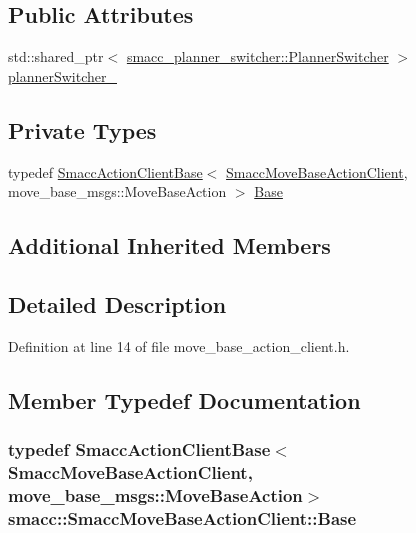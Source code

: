 \subsection*{Public Attributes}
\begin{DoxyCompactItemize}
\item 
std\+::shared\+\_\+ptr$<$ \hyperlink{classsmacc__planner__switcher_1_1PlannerSwitcher}{smacc\+\_\+planner\+\_\+switcher\+::\+Planner\+Switcher} $>$ \hyperlink{classsmacc_1_1SmaccMoveBaseActionClient_ae24164268108abf0b35cf51bfba5ec67}{planner\+Switcher\+\_\+}
\end{DoxyCompactItemize}
\subsection*{Private Types}
\begin{DoxyCompactItemize}
\item 
typedef \hyperlink{classsmacc_1_1SmaccActionClientBase}{Smacc\+Action\+Client\+Base}$<$ \hyperlink{classsmacc_1_1SmaccMoveBaseActionClient}{Smacc\+Move\+Base\+Action\+Client}, move\+\_\+base\+\_\+msgs\+::\+Move\+Base\+Action $>$ \hyperlink{classsmacc_1_1SmaccMoveBaseActionClient_a076cd5f05503e4689c9c34c4a8add1b8}{Base}
\end{DoxyCompactItemize}
\subsection*{Additional Inherited Members}


\subsection{Detailed Description}


Definition at line 14 of file move\+\_\+base\+\_\+action\+\_\+client.\+h.



\subsection{Member Typedef Documentation}
\subsubsection[{\texorpdfstring{Base}{Base}}]{\setlength{\rightskip}{0pt plus 5cm}typedef {\bf Smacc\+Action\+Client\+Base}$<${\bf Smacc\+Move\+Base\+Action\+Client}, move\+\_\+base\+\_\+msgs\+::\+Move\+Base\+Action$>$ {\bf smacc\+::\+Smacc\+Move\+Base\+Action\+Client\+::\+Base}\hspace{0.3cm}{\ttfamily [private]}}\hypertarget{classsmacc_1_1SmaccMoveBaseActionClient_a076cd5f05503e4689c9c34c4a8add1b8}{}\label{classsmacc_1_1SmaccMoveBaseActionClient_a076cd5f05503e4689c9c34c4a8add1b8}


